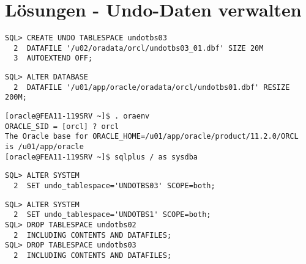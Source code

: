 \section{L\"osungen - Undo-Daten verwalten}
  \begin{enumerate}
    
      \begin{lstlisting}[language=oracle_sql]
SQL> CREATE UNDO TABLESPACE undotbs03
  2  DATAFILE '/u02/oradata/orcl/undotbs03_01.dbf' SIZE 20M
  3  AUTOEXTEND OFF;
      \end{lstlisting}
    
      \begin{enumerate}
        
          \begin{lstlisting}[language=oracle_sql]
SQL> ALTER DATABASE
  2  DATAFILE '/u01/app/oracle/oradata/orcl/undotbs01.dbf' RESIZE 200M;
          \end{lstlisting}
        
          \begin{lstlisting}[language=terminal]
[oracle@FEA11-119SRV ~]$ . oraenv
ORACLE_SID = [orcl] ? orcl
The Oracle base for ORACLE_HOME=/u01/app/oracle/product/11.2.0/ORCL
is /u01/app/oracle
[oracle@FEA11-119SRV ~]$ sqlplus / as sysdba
          \end{lstlisting}
        
        
        
          \begin{lstlisting}[language=oracle_sql]
SQL> ALTER SYSTEM
  2  SET undo_tablespace='UNDOTBS03' SCOPE=both;
          \end{lstlisting}
        
      \end{enumerate}
    
      \begin{lstlisting}[language=oracle_sql]
SQL> ALTER SYSTEM
  2  SET undo_tablespace='UNDOTBS1' SCOPE=both;
SQL> DROP TABLESPACE undotbs02
  2  INCLUDING CONTENTS AND DATAFILES;
SQL> DROP TABLESPACE undotbs03
  2  INCLUDING CONTENTS AND DATAFILES;
      \end{lstlisting}
  \end{enumerate}
